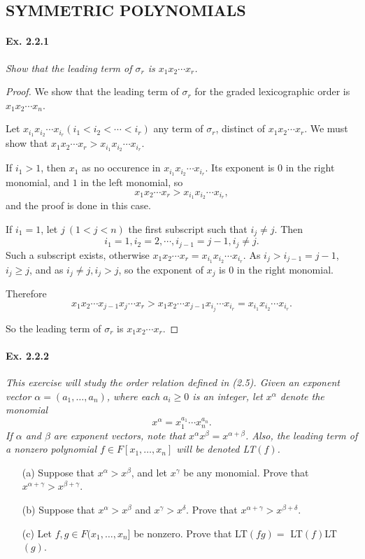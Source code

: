 \documentclass[11pt,a4paper]{article}
\begin{document}
\subsection{SYMMETRIC POLYNOMIALS}
\paragraph{Ex. 2.2.1}

{\it Show that the leading term of $\sigma_r$ is $x_1x_2\cdots x_r$.
}

\begin{proof}
We show that the leading term of $\sigma_r$ for the graded lexicographic order is $x_1x_2\cdots x_n$.

Let $x_{i_1}x_{i_2}\cdots x_{i_r}  (i_1 < i_2 < \cdots < i_r)$ any term of $\sigma_r$, distinct of $x_1x_2\cdots x_r$. We must show that $x_1x_2\cdots x_r > x_{i_1}x_{i_2}\cdots x_{i_r}$.

If $i_1>1$, then $x_1$ as no occurence in $x_{i_1}x_{i_2}\cdots x_{i_r}$. Its exponent is 0 in the right monomial, and $1$ in the left monomial, so $$x_1x_2\cdots x_r > x_{i_1}x_{i_2}\cdots x_{i_r},$$ and the proof is done in this case.

If $i_1 = 1$, let $j\ (1<j < n)$ the first subscript such that $i_j\neq j$. Then $$i_1=1, i_2=2,\cdots ,i_{j-1} = j-1, i_j\neq j.$$ Such a subscript exists, otherwise $x_1x_2\cdots x_r = x_{i_1}x_{i_2}\cdots x_{i_r}$. As $i_{j} > i_{j-1} = j-1$, $i_j \geq j$, and as $i_j\neq j, i_j > j$, so the exponent of $x_j$ is $0$ in the right monomial.

Therefore
$$x_1x_2\cdots  x_{j-1}x_j \cdots x_r > x_1x_2 \cdots x_{j-1} x_{i_j} \cdots x_{i_r} = x_{i_1}x_{i_2}\cdots x_{i_r}.$$

So the leading term of $\sigma_r$ is $x_1x_2\cdots x_r$.
\end{proof}

\paragraph{Ex. 2.2.2}

{\it This exercise will study the order relation defined in (2.5). Given an exponent vector $\alpha = (a_1,\ldots,a_n)$, where each $a_i \geq 0$ is an integer, let $x^\alpha$ denote the monomial
$$x^\alpha = x_1^{a_1}\cdots x_n^{a_n}.$$
If $\alpha$ and $\beta$ are exponent vectors, note that $x^{\alpha} x^{\beta} = x^{\alpha+\beta}$. Also, the leading term of a nonzero polynomial $f \in F[x_1,\ldots,x_n]$ will be denoted {\normalfont  \scriptsize LT}$(f)$.
\begin{enumerate}
\item[(a)] Suppose that $x^\alpha> x^\beta$, and let $x^\gamma$ be any monomial. Prove that $x^{\alpha+\gamma} > x^{\beta+\gamma}$.
\item[(b)] Suppose that $x^\alpha > x^\beta$ and $x^\gamma > x^\delta$. Prove that $x^{\alpha + \gamma} > x^{\beta + \delta}$.
\item[(c)] Let $f,g \in F(x_1,\ldots,x_n]$ be nonzero. Prove that {\normalfont  \scriptsize LT}$(fg) =$ {\normalfont  \scriptsize LT}$(f)${\normalfont  \scriptsize LT}$(g)$.
\end{enumerate}
}
\end{document}
